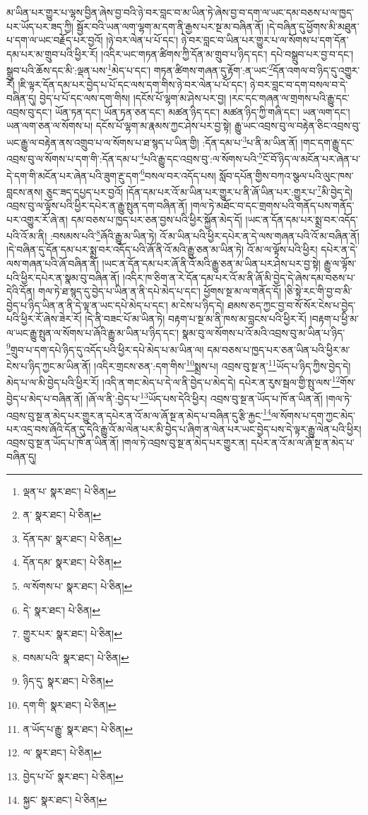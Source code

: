 མ་ཡིན་པར་གྱུར་པ་ལྷས་བྱིན་ཞེས་བྱ་བའི་ཉེ་བར་བླང་བ་མ་ཡིན་ཏེ་ཞེས་བྱ་བ་དག་ལ་ཡང་དམ་བཅས་པ་ལ་ཁྱད་པར་ཡོད་པར་ཟད་ཀྱི། སྦྱོར་བའི་ཡན་ལག་ལྷག་མ་དག་ནི་རྒྱས་པར་སྔ་མ་བཞིན་ནོ། །དེ་བཞིན་དུ་ཕྱོགས་མི་མཐུན་པ་དག་ལ་ཡང་བརྗོད་པར་བྱའོ། །ཉེ་བར་ལེན་པ་པོ་དང་། ཉེ་བར་བླང་བ་ཡིན་པར་གྱུར་པ་ལ་སོགས་པ་དག་དོན་དམ་པར་མ་གྲུབ་པའི་ཕྱིར་རོ། །འདིར་ཡང་གཏན་ཚིགས་ཀྱི་དོན་མ་གྲུབ་པ་ཉིད་དང་། དཔེ་བསྒྲུབ་པར་བྱ་བ་དང་། སྒྲུབ་པའི་ཆོས་དང་མི་:ལྡན་པས་\footnote{ལྡན་པ་  སྣར་ཐང་།  པེ་ཅིན། }མེད་པ་དང་། གཏན་ཚིགས་གཞན་དུ་རྟོག་:ན་ཡང་\footnote{ན་  སྣར་ཐང་།  པེ་ཅིན། }དོན་འགལ་བ་ཉིད་དུ་འགྱུར་རོ། །ཇི་ལྟར་དོན་དམ་པར་བྱེད་པ་པོ་དང་ལས་དག་གིས་ཉེ་བར་ལེན་པ་པོ་དང་། ཉེ་བར་བླང་བ་དག་བསལ་བ་དེ་བཞིན་དུ། བྱེད་པ་པོ་དང་ལས་དག་གིས། །དངོས་པོ་ལྷག་མ་ཤེས་པར་བྱ། །རང་དང་གཞན་ལ་གྲགས་པའི་རྒྱུ་དང་འབྲས་བུ་དང་། ཡོན་ཏན་དང་། ཡོན་ཏན་ཅན་དང་། མཚན་ཉིད་དང་། མཚན་ཉིད་ཀྱི་གཞི་དང་། ཡན་ལག་དང་། ཡན་ལག་ཅན་ལ་སོགས་པ། དངོས་པོ་ལྷག་མ་རྣམས་ཀྱང་ཤེས་པར་བྱ་སྟེ། རྒྱུ་ཡང་འབྲས་བུ་ལ་བརྟེན་ཅིང་འབྲས་བུ་ཡང་རྒྱུ་ལ་བརྟེན་ནས་འགྲུབ་པ་ལ་སོགས་པ་ཐ་སྙད་པ་ཡིན་གྱི། :དོན་དམ་པ་\footnote{དོན་དམ་  སྣར་ཐང་།  པེ་ཅིན། }པ་ནི་མ་ཡིན་ནོ། །གང་དག་རྒྱུ་དང་འབྲས་བུ་ལ་སོགས་པ་དག་གི་:དོན་དམ་པ་\footnote{དོན་དམ་  སྣར་ཐང་།  པེ་ཅིན། }པའི་རྒྱུ་དང་འབྲས་བུ་:ལ་སོགས་པའི་\footnote{ལ་སོགས་པ་  སྣར་ཐང་།  པེ་ཅིན། }ངོ་བོ་ཉིད་ལ་མངོན་པར་ཞེན་པ་དེ་དག་གི་མངོན་པར་ཞེན་པའི་ཟུག་རྔུ་དག་\footnote{དེ་  སྣར་ཐང་།  པེ་ཅིན། }བསལ་བར་འདོད་པས། སློབ་དཔོན་གྱིས་བཀའ་སྩལ་པའི་ལུང་ཁས་བླངས་ནས། ཅུང་ཟད་དཔྱད་པར་བྱའོ། །དོན་དམ་པར་འོ་མ་ཡིན་པར་གྱུར་པ་ནི་ཞོ་ཡིན་པར་:གྱུར་པ་\footnote{གྱུར་པར་  སྣར་ཐང་།  པེ་ཅིན། }མི་བྱེད་དེ། འབྲས་བུ་ལ་ལྟོས་པའི་ཕྱིར་དཔེར་ན་རྒྱུ་སྤུན་དག་བཞིན་ནོ། །གལ་ཏེ་མཐོང་བ་དང་གྲགས་པའི་གནོད་པས་གནོད་པར་འགྱུར་རོ་ཞེ་ན། དམ་བཅས་པ་ཁྱད་པར་ཅན་བྱས་པའི་ཕྱིར་སྐྱོན་མེད་དོ། །ཡང་ན་དོན་དམ་པར་སྨྲ་བར་འདོད་པའི་འོ་མ་ནི། :བསམས་པའི་\footnote{བསམ་པའི་  སྣར་ཐང་།  པེ་ཅིན། }ཞོའི་རྒྱུ་མ་ཡིན་ཏེ། འོ་མ་ཡིན་པའི་ཕྱིར་དཔེར་ན་དེ་ལས་གཞན་པའི་འོ་མ་བཞིན་ནོ། །དེ་བཞིན་དུ་དོན་དམ་པར་སྨྲ་བར་འདོད་པའི་ཞོ་ནི་འོ་མའི་རྒྱུ་ཅན་མ་ཡིན་ཏེ། འོ་མ་ལ་ལྟོས་པའི་ཕྱིར། དཔེར་ན་དེ་ལས་གཞན་པའི་ཞོ་བཞིན་ནོ། །ཡང་ན་དོན་དམ་པར་ཞོ་ནི་འོ་མའི་རྒྱུ་ཅན་མ་ཡིན་པར་ཤེས་པར་བྱ་སྟེ། རྒྱུ་ལ་ལྟོས་པའི་ཕྱིར་དཔེར་ན་སྣམ་བུ་བཞིན་ནོ། །འདིར་ཁ་ཅིག་ན་རེ་དོན་དམ་པར་འོ་མ་ནི་ཞོ་མི་བྱེད་དེ་ཞེས་དམ་བཅས་པ་དེའི་དོན། གལ་ཏེ་ཐ་སྙད་དུ་བྱེད་པ་ཡིན་ན་ནི་དཔེ་མེད་པ་དང་། ཕྱོགས་སྔ་མ་ལ་གནོད་དོ། །ཅི་སྟེ་རང་གི་བྱ་བ་མི་བྱེད་པ་ཉིད་ཡིན་ན་ནི་དེ་ལྟ་ན་ཡང་དཔེ་མེད་པ་དང་། མ་ངེས་པ་ཉིད་དེ། ཐམས་ཅད་ཀྱང་བྱ་བ་སོ་སོར་ངེས་པ་བྱེད་པའི་ཕྱིར་རོ་ཞེས་ཟེར་རོ། །དེ་ནི་བཟང་པོ་མ་ཡིན་ཏེ། བརྟག་པ་སྔ་མ་ནི་ཁས་མ་བླངས་པའི་ཕྱིར་རོ། །བརྟག་པ་ཕྱི་མ་ལ་ཡང་རྒྱུ་སྤུན་ལ་སོགས་པ་ཞོའི་རྒྱུ་མ་ཡིན་པ་ཉིད་དང་། སྣམ་བུ་ལ་སོགས་པ་འོ་མའི་འབྲས་བུ་མ་ཡིན་པ་ཉིད་\footnote{ཉིད་དུ་  སྣར་ཐང་།  པེ་ཅིན། }གྲུབ་པ་དག་དཔེ་ཉིད་དུ་འདོད་པའི་ཕྱིར་དཔེ་མེད་པ་མ་ཡིན་ལ། དམ་བཅས་པ་ཁྱད་པར་ཅན་ཡིན་པའི་ཕྱིར་མ་ངེས་པ་ཉིད་ཀྱང་མ་ཡིན་ནོ། །འདིར་གྲངས་ཅན་:དག་གིས་\footnote{དག་གི་  སྣར་ཐང་།  པེ་ཅིན། }སྨྲས་པ། འབྲས་བུ་སྔ་ན་\footnote{ན་ཡོད་པ་རྒྱུ་  སྣར་ཐང་།  པེ་ཅིན། }ཡོད་པ་ཉིད་ཀྱིས་བྱེད་དེ། མེད་པ་ལ་མི་བྱེད་པའི་ཕྱིར་རོ། །འདི་ན་གང་མེད་པ་དེ་ལ་ནི་བྱེད་པ་མེད་དེ། དཔེར་ན་རུས་སྦལ་གྱི་སྤུ་ལས་\footnote{ལ་  སྣར་ཐང་།  པེ་ཅིན། }གོས་བྱེད་པ་མེད་པ་བཞིན་ནོ། །ཞོ་ལ་ནི་:བྱེད་པ་\footnote{བྱེད་པ་པོ་  སྣར་ཐང་།  པེ་ཅིན། }ཡོད་པས་དེའི་ཕྱིར། འབྲས་བུ་སྔ་ན་ཡོད་པ་ཁོ་ན་ཡིན་ནོ། །གལ་ཏེ་འབྲས་བུ་སྔ་ན་མེད་པར་གྱུར་ན་དཔེར་ན་འོ་མ་ལ་ཞོ་སྔ་ན་མེད་པ་བཞིན་དུ་རྩི་རྐྱང་\footnote{སྐྱང་  སྣར་ཐང་།  པེ་ཅིན། }ལ་སོགས་པ་དག་ཀྱང་མེད་པར་འདྲ་བས་ཞོའི་དོན་དུ་དེའི་རྒྱུ་འོ་མ་ལེན་པར་མི་བྱེད་པ་ཞིག་ན་ལེན་པར་ཡང་བྱེད་པས་དེ་ལྟར་རྒྱུ་ལེན་པའི་ཕྱིར། འབྲས་བུ་སྔ་ན་ཡོད་པ་ཁོ་ན་ཡིན་ནོ། །གལ་ཏེ་འབྲས་བུ་སྔ་ན་མེད་པར་གྱུར་ན། དཔེར་ན་འོ་མ་ལ་ཞོ་སྔ་ན་མེད་པ་བཞིན་དུ། 